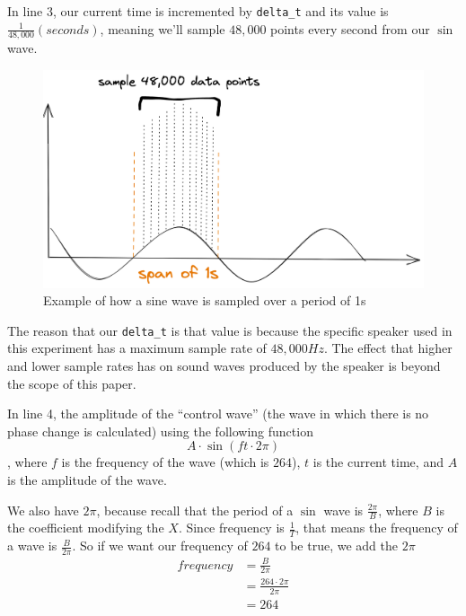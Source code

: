 \documentclass[index]{subfiles}
\begin{document}
In line 3, our current time is incremented by \verb+delta_t+ and its value is \(\frac{1}{48,000}(seconds)\), meaning we'll sample \(48,000\) points every second from our \(\sin\) wave.

\begin{figure}[H]
    \centering
    \includegraphics[scale=0.15]{res/sampling.png}
    \caption{Example of how a sine wave is sampled over a period of 1s}
\end{figure}

The reason that our \verb+delta_t+ is that value is because the specific speaker used in this experiment has a maximum sample rate of \(48,000Hz\). The effect that higher and lower sample rates has on sound waves produced by the speaker is beyond the scope of this paper.

In line 4, the amplitude of the ``control wave'' (the wave in which there is no phase change is calculated) using the following function
\begin{equation*}
    A\cdot\sin\left(ft\cdot2\pi\right)
\end{equation*}, where \(f\) is the frequency of the wave (which is \(264\)), \(t\) is the current time, and \(A\) is the amplitude of the wave.

We also have \(2\pi\), because recall that the period of a \(\sin\) wave is \(\frac{2\pi}{B}\), where \(B\) is the coefficient modifying the \(X\). Since frequency is \(\frac{1}{T}\), that means the frequency of a wave is \(\frac{B}{2\pi}\). So if we want our frequency of \(264\) to be true, we add the \(2\pi\)
\begin{align*}
    frequency & =\frac{B}{2\pi}            \\
              & =\frac{264\cdot2\pi}{2\pi} \\
              & =264
\end{align*}
\end{document}
